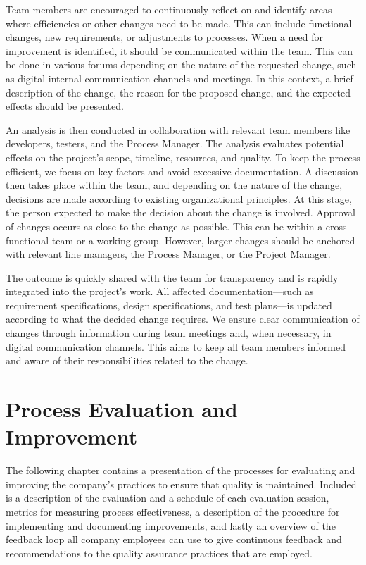 \documentclass{article}
\begin{document}
Team members are encouraged to continuously reflect on and identify areas where efficiencies or other changes need to be made. This can include functional changes, new requirements, or adjustments to processes. When a need for improvement is identified, it should be communicated within the team. This can be done in various forums depending on the nature of the requested change, such as digital internal communication channels and meetings. In this context, a brief description of the change, the reason for the proposed change, and the expected effects should be presented.

An analysis is then conducted in collaboration with relevant team members like developers, testers, and the Process Manager. The analysis evaluates potential effects on the project’s scope, timeline, resources, and quality. To keep the process efficient, we focus on key factors and avoid excessive documentation. A discussion then takes place within the team, and depending on the nature of the change, decisions are made according to existing organizational principles. At this stage, the person expected to make the decision about the change is involved. Approval of changes occurs as close to the change as possible. This can be within a cross-functional team or a working group. However, larger changes should be anchored with relevant line managers, the Process Manager, or the Project Manager.

The outcome is quickly shared with the team for transparency and is rapidly integrated into the project’s work. All affected documentation—such as requirement specifications, design specifications, and test plans—is updated according to what the decided change requires. We ensure clear communication of changes through information during team meetings and, when necessary, in digital communication channels. This aims to keep all team members informed and aware of their responsibilities related to the change.

\newpage
\section{Process Evaluation and Improvement}
The following chapter contains a presentation of the processes for evaluating and improving the company's practices to ensure that quality is maintained. Included is a description of the evaluation and a schedule of each evaluation session, metrics for measuring process effectiveness, a description of the procedure for implementing and documenting improvements, and lastly an overview of the feedback loop all company employees can use to give continuous feedback and recommendations to the quality assurance practices that are employed. 
\end{document}
